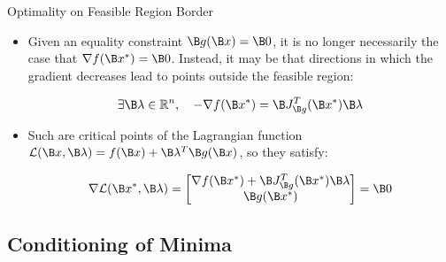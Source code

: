 \begin{frame}{Optimality on Feasible Region Border}

\begin{itemize}
\item Given an equality constraint $\B g(\B x)=\B 0$, %
      it is no longer necessarily the case that $\nabla f(\B x^*) =\B 0$.
      Instead, it may be that directions in which the gradient decreases lead to points outside the feasible region:

\[\exists \B \lambda\in\mathbb{R}^n, \quad -\nabla f(\B x^*) = \B J^T_{\B g}(\B x^*) \B \lambda\]


\item Such  are critical points of the Lagrangian function $\mathcal{L}(\B x, \B \lambda) = f(\B x) + \B \lambda^T\B g(\B x)$, so they satisfy: %

\[\nabla \mathcal{L}(\B x^*, \B \lambda) = \begin{bmatrix} \nabla f(\B x^*) + \B J_{\B g}^T(\B x^*) \B \lambda \\ \B g(\B x^*)\end{bmatrix} = \B 0\]



\end{itemize}


\end{frame}

\subsection{Conditioning of Minima}

